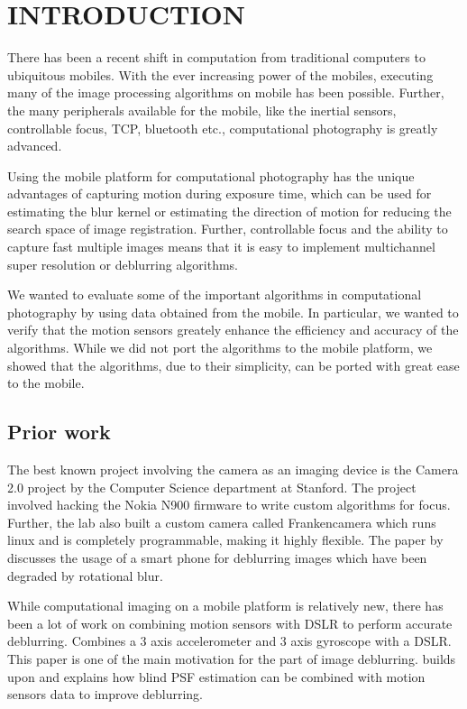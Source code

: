 \documentclass[BTech]{iitmdiss}
\begin{document}
\pagebreak


\chapter{INTRODUCTION}
\label{chap:intro}
There has been a recent shift in computation from traditional computers
to ubiquitous mobiles. With the ever increasing power of the mobiles, 
executing many of the image processing algorithms on mobile has been 
possible. Further, the many peripherals available for the mobile, like
the inertial sensors, controllable focus, TCP, bluetooth etc., 
computational photography is greatly advanced. 

Using the mobile platform for computational photography has the unique
advantages of capturing motion during exposure time, which can be used
for estimating the blur kernel or estimating the direction of motion
for reducing the search space of image registration. Further, 
controllable focus and the ability to capture fast multiple images means
that it is easy to implement multichannel super resolution or deblurring
algorithms. 

We wanted to evaluate some of the important algorithms in computational
photography by using data obtained from the mobile. In particular, we 
wanted to verify that the motion sensors greately enhance the efficiency
and accuracy of the algorithms. While we did not port the algorithms to
the mobile platform, we showed that the algorithms, due to their simplicity,
can be ported with great ease to the mobile. 

\section{Prior work}
\label{intro:prior_work}
The best known project involving the camera as an imaging device is the 
Camera 2.0 project by the Computer Science department at Stanford. The
project involved hacking the Nokia N900 firmware to write custom algorithms
for focus. Further, the lab also built a custom camera called Frankencamera
which runs linux and is completely programmable, making it highly flexible.
The paper by \cite{vsindelavr2013image} discusses the usage of a smart
phone for deblurring images which have been degraded by rotational blur.

While computational imaging on a mobile platform is relatively new, there
has been a lot of work on combining motion sensors with DSLR to perform
accurate deblurring. \cite{joshi2010image} Combines a 3 axis accelerometer
and 3 axis gyroscope with a DSLR. This paper is one of the main motivation
for the part of image deblurring. \cite{bae2013accurate} builds upon
\cite{joshi2010image} and explains how blind PSF estimation can be
combined with motion sensors data to improve deblurring. 
\end{document}
